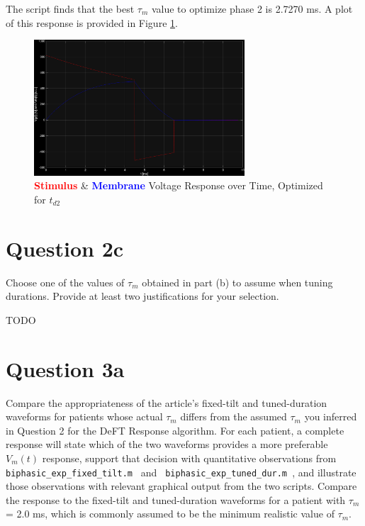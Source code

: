 \documentclass[]{report}
\begin{document}
The script finds that the best $\tau_m$ value to optimize phase 2 is 2.7270 ms. A plot of this response is provided in Figure \ref{fig:phase2}.

\begin{figure}[H]
	\centering
	\includegraphics[width=0.7\textwidth]{phase2_response.png}
	\caption{\textcolor{red}{\textbf{Stimulus}} \& \textcolor{blue}{\textbf{Membrane}} Voltage Response over Time, Optimized for $t_{d2}$}
	\label{fig:phase2}
\end{figure}


\section*{Question 2c}

Choose one of the values of $\tau_m$ obtained in part (b) to assume when tuning durations. Provide 
at least two justifications for your selection. 

TODO

\section*{Question 3a}

Compare the appropriateness of the article’s fixed-tilt and tuned-duration waveforms for patients 
whose actual $\tau_m$ differs from the assumed  $\tau_m$ you inferred in Question 2 for the DeFT Response 
algorithm. For each patient, a complete response will state which of the two waveforms provides 
a more preferable $V_m(t)$ response, support that decision with quantitative observations from 
\texttt{ biphasic\_exp\_fixed\_tilt.m } and \texttt{ biphasic\_exp\_tuned\_dur.m }, and illustrate those 
observations with relevant graphical output from the two scripts. Compare the response to the fixed-tilt and tuned-duration waveforms for a patient with $\tau_m$ = 2.0 ms, which is commonly assumed to be the minimum realistic value of  $\tau_m$. 
\end{document}
